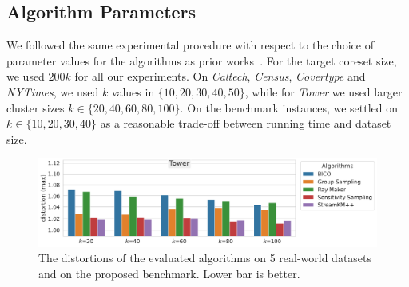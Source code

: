 \subsection{Algorithm Parameters}
We followed the same experimental procedure with respect to the choice of parameter values for the algorithms as prior works~\cite{AckermannMRSLS12, FGSSS13}. For the target coreset size, we used $200k$ for all our experiments. On \textit{Caltech}, \textit{Census},  \textit{Covertype} and \textit{NYTimes}, we used $k$ values in $\{10, 20, 30, 40, 50\}$, while for \textit{Tower} we used larger cluster sizes $k \in \{20, 40, 60, 80, 100\}$. On the benchmark instances, we settled on $k \in \{10, 20, 30, 40\}$ as a reasonable trade-off between running time and dataset size.



\begin{figure}
  \caption{The distortions of the evaluated algorithms on 5 real-world datasets and on the proposed benchmark. Lower bar is better.}
  \label{fig:distortions}
  \includegraphics[width=.65\linewidth]{figures/distortions-Tower.pdf}
  \newline \newline
  \newline \newline
\end{figure}
